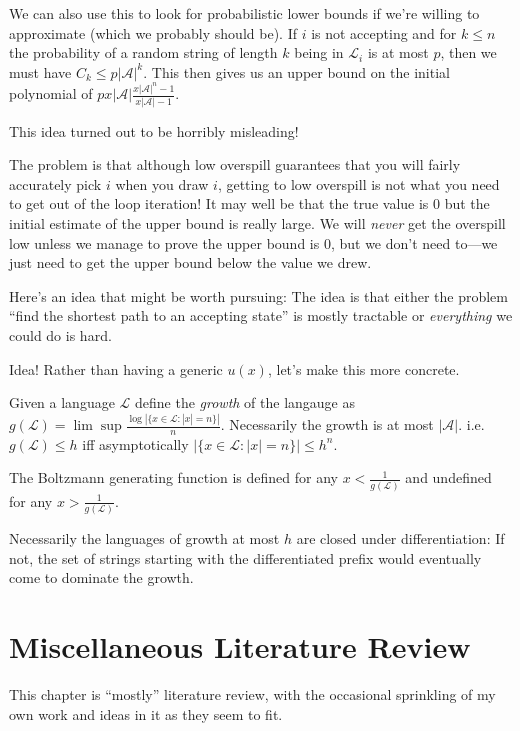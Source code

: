 \documentclass[a4paper]{book}
\begin{document}
We can also use this to look for probabilistic lower bounds if we're willing to approximate (which we probably should be).
If \(i\) is not accepting and for \(k \leq n\) the probability of a random string of length \(k\) being in \(\mathcal{L}_i\) is at most \(p\),
then we must have \(C_k \leq p |\mathcal{A}|^k\).
This then gives us an upper bound on the initial polynomial of \(p x |\mathcal{A}| \frac{{x |\mathcal{A}|}^n - 1}{x |\mathcal{A}| - 1}\).

This idea turned out to be horribly misleading!

The problem is that although low overspill guarantees that you will fairly accurately pick \(i\) when you draw \(i\),
getting to low overspill is not what you need to get out of the loop iteration!
It may well be that the true value is \(0\) but the initial estimate of the upper bound is really large.
We will \emph{never} get the overspill low unless we manage to prove the upper bound is \(0\),
but we don't need to---we just need to get the upper bound below the value we drew.

Here's an idea that might be worth pursuing:
The idea is that either the problem ``find the shortest path to an accepting state'' is mostly tractable or \emph{everything} we could do is hard.

Idea! Rather than having a generic \(u(x)\),
let's make this more concrete.

Given a language \(\mathcal{L}\) define the \emph{growth} of the langauge as \(g(\mathcal{L}) = \lim\sup \frac{\log |\{x \in \mathcal{L}: |x| = n\}|}{n}\).
Necessarily the growth is at most \(|\mathcal{A}|\).
i.e. \(g(\mathcal{L}) \leq h\) iff asymptotically \(|\{x \in \mathcal{L}: |x| = n\}| \leq h^n\).

The Boltzmann generating function is defined for any \(x < \frac{1}{g(\mathcal{L})}\) and undefined for any \(x > \frac{1}{g(\mathcal{L})}\).

Necessarily the languages of growth at most \(h\) are closed under differentiation:
If not, the set of strings starting with the differentiated prefix would eventually come to dominate the growth.

\chapter{Miscellaneous Literature Review}

This chapter is ``mostly'' literature review,
with the occasional sprinkling of my own work and ideas in it as they seem to fit.
\end{document}
